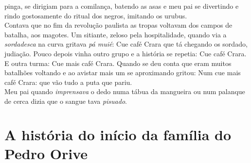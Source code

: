 \documentclass[12pt,brazil,]{book}
\begin{document}
pinga, se dirigiam para a comilança, batendo as asas e meu pai se
divertindo e rindo gostosamente do ritual dos negros, imitando os
urubus.\\
Contava que no fim da revolução paulista as tropas voltavam dos campos
de batalha, aos magotes. Um sitiante, zeloso pela hospitalidade, quando
via a \emph{sordadesca} na curva gritava \emph{pá muié}: Cue café Crara
que tá chegando os sordado, judiação. Pouco depois vinha outro grupo e a
história se repetia: Cue café Crara. E outra turma: Cue mais café Crara.
Quando se deu conta que eram muitos batalhões voltando e ao avistar mais
um se aproximando gritou: Num cue mais café Crara: que vão tudo a puta
que pariu.\\
Meu pai quando \emph{imprensava} o dedo numa tábua da mangueira ou num
palanque de cerca dizia que o sangue tava \emph{pisuado}.

\section{A história do início da família do Pedro
Orive}\label{a-histuxf3ria-do-inuxedcio-da-famuxedlia-do-pedro-orive}
\end{document}

